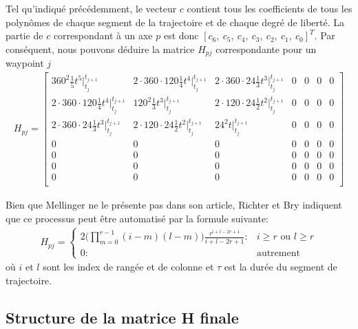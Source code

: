 Tel qu'indiqué précédemment, le vecteur $c$ contient tous les coefficients de tous les polynômes de chaque segment de la trajectoire et de chaque degré de liberté. La partie de $c$ correspondant à un axe $p$ est donc $[c_6,\ c_5,\ c_4,\ c_3,\ c_2,\ c_1,\ c_0]^T$. Par conséquent, nous pouvons déduire la matrice $H_{pj}$ correspondante pour un waypoint $j$
\begin{align}\label{eq:hessienne_p}
H_{pj} =
\begin{bmatrix}
    360^2 \frac{1}{5} t^5 \Big|_{t_j}^{t_{j+1}}
    		& 2 \cdot 360 \cdot 120 \frac{1}{4} t^4\Big|_{t_j}^{t_{j+1}}
    		& 2 \cdot 360 \cdot 24 \frac{1}{3} t^3\Big|_{t_j}^{t_{j+1}}
    		& 0
    		& 0
    		& 0
	    	& 0 \\
    2 \cdot 360 \cdot 120 \frac{1}{4} t^4\Big|_{t_j}^{t_{j+1}}
    		& 120^2 \frac{1}{3} t^3\Big|_{t_j}^{t_{j+1}}
    		& 2 \cdot 120 \cdot 24 \frac{1}{2}t^2 \Big|_{t_j}^{t_{j+1}} & 0 & 0 & 0 & 0\\
	2 \cdot 360 \cdot 24 \frac{1}{3} t^3\Big|_{t_j}^{t_{j+1}}
		& 2 \cdot 120 \cdot 24 \frac{1}{2}t^2 \Big|_{t_j}^{t_{j+1}}
		& 24^2 t\Big|_{t_j}^{t_{j+1}} & 0 & 0 & 0 & 0 \\
    0 & 0 & 0 & 0 & 0 & 0 & 0 \\
    0 & 0 & 0 & 0 & 0 & 0 & 0 \\
    0 & 0 & 0 & 0 & 0 & 0 & 0 \\
    0 & 0 & 0 & 0 & 0 & 0 & 0 \\
\end{bmatrix}
\end{align}

Bien que Mellinger ne le présente pas dans son article, Richter et Bry \cite{Richter2016, bry2012control} indiquent que ce processus peut être automatisé par la formule suivante:
\begin{align}
H_{pj} =\left\{
  \begin{array}{ll}
    2 \Big( \prod_{m = 0}^{r-1} (i-m)(l-m)\Big) \frac{\tau^{i+l-2r+1}}{i+l-2r+1}: & i \geq r \text{ ou } l \geq r \\
    0 : & \text{autrement}
  \end{array}
  \right.
\end{align}
où $i$ et $l$ sont les index de rangée et de colonne et $\tau$ est la durée du segment de trajectoire.

\subsection{Structure de la matrice H finale}

